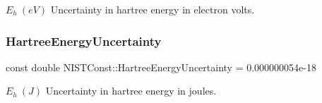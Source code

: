 $E_h \ (eV)$ Uncertainty in hartree energy in electron volts. \mbox{\label{group___hartree_energy_gaabdf38a4c491ca0f606bf042c8479801}} 
\subsubsection{\texorpdfstring{Hartree\+Energy\+Uncertainty}{HartreeEnergyUncertainty}}
{\footnotesize\ttfamily const double N\+I\+S\+T\+Const\+::\+Hartree\+Energy\+Uncertainty = 0.\+000000054e-\/18}

$E_h \ (J)$ Uncertainty in hartree energy in joules. 